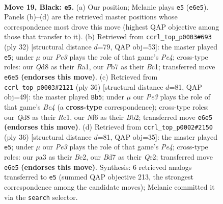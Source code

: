 \documentclass[11pt]{article}
\begin{document}
\clearpage

\begin{figure}[p]\centering
\begin{subfigure}{0.46\textwidth}\centering
\resizebox{\linewidth}{!}{%
\newchessgame
\chessboard[
  setfen={rn1qr1k1/pp1bbppp/4pn2/2Pp4/3P3N/P1N4P/1P1B1PP1/1BRQR1K1 b - - 4 19},
  showmover=false,
  pgfstyle=straightmove, color=movearrow, markmove={e6-e5}
]}
\caption{}
\end{subfigure}\hfill
\begin{subfigure}{0.46\textwidth}\centering
\resizebox{\linewidth}{!}{%
\newchessgame
\chessboard[
  setfen={1r1qrbk1/2pb1pp1/p2p1n1p/n7/Pp2PP2/2P2N1P/1PBN2P1/R1BQR1K1 w - - 2 17},
  showmover=false,
  pgfstyle=straightmove, color=movearrow, markmove={e4-e5}
]}
\caption{}
\end{subfigure}
\\[4pt]
\begin{subfigure}{0.46\textwidth}\centering
\resizebox{\linewidth}{!}{%
\newchessgame
\chessboard[
  setfen={2rqr1k1/1b1nbppp/1p2p3/p7/2BPn2P/PP2NN2/1B2QPP1/2R1R1K1 w - - 1 19},
  showmover=false,
  pgfstyle=straightmove, color=movearrow, markmove={c4-b5}
]}
\caption{}
\end{subfigure}\hfill
\begin{subfigure}{0.46\textwidth}\centering
\resizebox{\linewidth}{!}{%
\newchessgame
\chessboard[
  setfen={rqr3k1/1b1nbpp1/p3pn1p/1p6/3BP3/P1N2N1P/1PBRQPP1/R5K1 w - - 0 19},
  showmover=false,
  pgfstyle=straightmove, color=movearrow, markmove={e4-e5}
]}
\caption{}
\end{subfigure}
\caption{\textbf{Move 19, Black: \texttt{e5}.} (a) Our position; Melanie plays \texttt{e5} (\texttt{e6e5}). Panels (b)--(d) are the retrieved master positions whose correspondence most drove this move (highest QAP objective among those that transfer to it). (b) Retrieved from \texttt{ccrl\_top\_p0003\#693} (ply 32) [structural distance $d$=79, QAP obj=53]: the master played \texttt{e5}; under $\mu$ our \emph{Pe3} plays the role of that game's \emph{Pe4}; cross-type roles: our \emph{Q}d8 as their \emph{R}a1, our \emph{P}b7 as their \emph{B}c1; transferred move \texttt{e6e5} \textbf{(endorses this move)}. (c) Retrieved from \texttt{ccrl\_top\_p0003\#2121} (ply 36) [structural distance $d$=81, QAP obj=49]: the master played \texttt{Bb5}; under $\mu$ our \emph{Pe3} plays the role of that game's \emph{Bc4} (a \textbf{cross-type} correspondence); cross-type roles: our \emph{Q}d8 as their \emph{R}c1, our \emph{N}f6 as their \emph{B}b2; transferred move \texttt{e6e5} \textbf{(endorses this move)}. (d) Retrieved from \texttt{ccrl\_top\_p0002\#2150} (ply 36) [structural distance $d$=81, QAP obj=35]: the master played \texttt{e5}; under $\mu$ our \emph{Pe3} plays the role of that game's \emph{Pe4}; cross-type roles: our \emph{p}a3 as their \emph{B}c2, our \emph{B}d7 as their \emph{Q}e2; transferred move \texttt{e6e5} \textbf{(endorses this move)}. Synthesis: 6 retrieved analogs transferred to \texttt{e5} (summed QAP objective 213, the strongest correspondence among the candidate moves); Melanie committed it via the \texttt{search} selector.}
\label{fig:thought-m37}
\end{figure}
\end{document}
